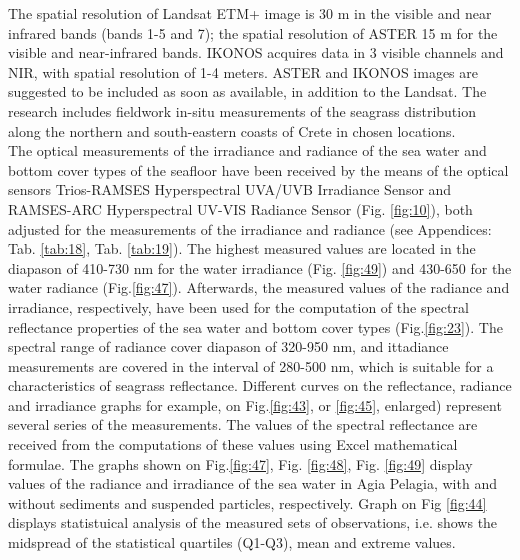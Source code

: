 \documentclass[10pt, a4paper]{article}
\begin{document}
The spatial resolution of Landsat ETM+ image is 30 m in the visible and near infrared bands (bands
1-5 and 7); the spatial resolution of ASTER 15 m for the visible and near-infrared bands. IKONOS
acquires data in 3 visible channels and NIR, with spatial resolution of 1-4 meters. ASTER and
IKONOS images are suggested to be included as soon as available, in addition to the Landsat. The
research includes fieldwork in-situ measurements of the seagrass distribution along the northern and
south-eastern coasts of Crete in chosen locations.\\
The optical measurements of the irradiance and radiance of the sea water and bottom cover types of
the seafloor have been received by the means of the optical sensors Trios-RAMSES Hyperspectral
UVA/UVB Irradiance Sensor and RAMSES-ARC Hyperspectral UV-VIS Radiance Sensor (Fig. \ref{fig:10}), both adjusted for the measurements of the irradiance and radiance (see Appendices: Tab. \ref{tab:18}, Tab. \ref{tab:19}).
The highest measured values are located in the diapason of 410-730 nm for the water irradiance (Fig. \ref{fig:49}) and 430-650 for the water radiance (Fig.\ref{fig:47}). 
Afterwards, the measured values of the
radiance and irradiance, respectively, have been used for the computation of the spectral reflectance
properties of the sea water and bottom cover types (Fig.\ref{fig:23}). The spectral range of radiance
cover diapason of 320-950 nm, and ittadiance measurements are covered in the interval of 280-500
nm, which is suitable for a characteristics of seagrass reflectance.
Different curves on the reflectance, radiance and irradiance graphs for example, on Fig.\ref{fig:43}, or \ref{fig:45}, enlarged) represent several series of
the measurements. The values of the spectral reflectance are received from the
computations of these values using Excel mathematical formulae. The graphs shown on Fig.\ref{fig:47}, Fig. \ref{fig:48}, Fig. \ref{fig:49} display values of the radiance and irradiance of the sea water in Agia Pelagia, with and without sediments and suspended particles, respectively. Graph on Fig \ref{fig:44} displays statistuical analysis of the measured sets of observations, i.e. shows the midspread of the statistical quartiles (Q1-Q3), mean and extreme values.
\end{document}
